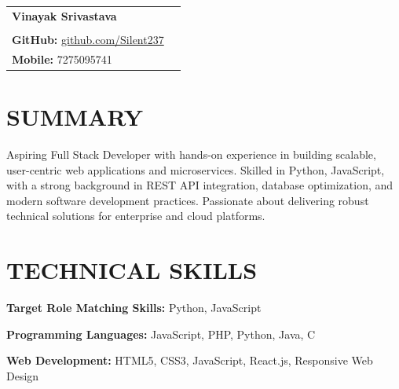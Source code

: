 \documentclass[a4paper,10.9pt]{article}
\begin{document}

\begin{tabularx}{\textwidth}{@{}X r@{}}
{\fontsize{22}{24}\selectfont\bfseries\color{hdrblue}Vinayak Srivastava} & \\[-1pt]
\vspace{1}

\begin{tabular}[t]{@{}l@{}}
{\small\textbf{LinkedIn:}
\href{https://www.linkedin.com/in/vinayak-srivastava-silent}
{linkedin.com/in/vinayak-srivastava-silent}}\\[-2pt]

{\small\textbf{GitHub:}
\href{https://github.com/Silent237}{github.com/Silent237}}
\end{tabular}

&

\begin{tabular}[t]{@{}r@{}}
{\small\textbf{Email:}
\href{mailto:vinayaksrivastava063@gmail.com}{vinayaksrivastava063@gmail.com}}\\[-2pt]

{\small\textbf{Mobile:} 7275095741}
\end{tabular}

\end{tabularx}

\vspace{-6pt}


\section*{SUMMARY}

Aspiring Full Stack Developer with hands-on experience in building scalable, user-centric web applications and microservices. Skilled in Python, JavaScript, with a strong background in REST API integration, database optimization, and modern software development practices. Passionate about delivering robust technical solutions for enterprise and cloud platforms.

\section*{TECHNICAL SKILLS}

\textbf{Target Role Matching Skills:} Python, JavaScript

\textbf{Programming Languages:} JavaScript, PHP, Python, Java, C

\textbf{Web Development:} HTML5, CSS3, JavaScript, React.js, Responsive Web Design
\end{document}
